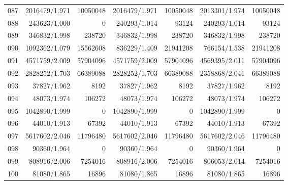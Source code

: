 \begin{longtable}{crrrrrr}
087 & 2016479/1.971 & 10050048 & 2016479/1.971 & 10050048 & 2013301/1.974 & 10050048 \\
088 & 243623/1.000 & 0 & 240293/1.014 & 93124 & 240293/1.014 & 93124 \\
089 & 346832/1.998 & 238720 & 346832/1.998 & 238720 & 346832/1.998 & 238720 \\
090 & 1092362/1.079 & 15562608 & 836229/1.409 & 21941208 & 766154/1.538 & 21941208 \\
091 & 4571759/2.009 & 57904096 & 4571759/2.009 & 57904096 & 4569395/2.011 & 57904096 \\
092 & 2828252/1.703 & 66389088 & 2828252/1.703 & 66389088 & 2358868/2.041 & 66389088 \\
093 & 37827/1.962 & 8192 & 37827/1.962 & 8192 & 37827/1.962 & 8192 \\
094 & 48073/1.974 & 106272 & 48073/1.974 & 106272 & 48073/1.974 & 106272 \\
095 & 1042890/1.999 & 0 & 1042890/1.999 & 0 & 1042890/1.999 & 0 \\
096 & 44010/1.913 & 67392 & 44010/1.913 & 67392 & 44010/1.913 & 67392 \\
097 & 5617602/2.046 & 11796480 & 5617602/2.046 & 11796480 & 5617602/2.046 & 11796480 \\
098 & 90360/1.964 & 0 & 90360/1.964 & 0 & 90360/1.964 & 0 \\
099 & 808916/2.006 & 7254016 & 808916/2.006 & 7254016 & 806053/2.014 & 7254016 \\
100 & 81080/1.865 & 16896 & 81080/1.865 & 16896 & 81080/1.865 & 16896 \\
\end{longtable}

